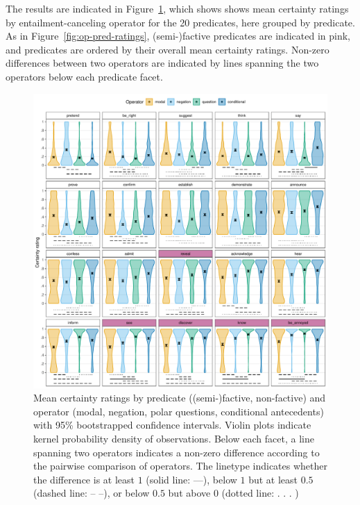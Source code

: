 \documentclass[a4paper,12pt,twoside]{article}
\begin{document}
    The results are indicated in Figure~\ref{fig:op-pred-analysis}, which shows shows mean certainty ratings by entailment-canceling operator for the 20 predicates, here grouped by predicate. As in Figure~\ref{fig:op-pred-ratings}, (semi-)factive predicates are indicated in pink, and predicates are ordered by their overall mean certainty ratings. Non-zero differences between two operators are indicated by lines spanning the two operators below each predicate facet.

    \begin{figure}[t]
        \centering
		\includegraphics[width = \linewidth]{analysis.pdf}
		\caption{Mean certainty ratings by predicate (\textcolor{pred-fcv-color}{(semi-)factive}, non-factive) and operator (\textcolor{op-m-color}{modal},  \textcolor{op-n-color}{negation}, \textcolor{op-q-color}{polar questions}, \textcolor{op-c-color}{conditional antecedents}) with 95\% bootstrapped confidence intervals. Violin plots indicate kernel probability density of observations. Below each facet, a line spanning two operators indicates a non-zero difference according to the pairwise comparison of operators. The linetype indicates whether the difference is
        at least $1$ (solid line: —),
        below $1$ but at least $0.5$ (dashed line: – –),
        or below $0.5$ but above $0$ (dotted line: . . . )}
		\label{fig:op-pred-analysis}
	\end{figure}
\end{document}
